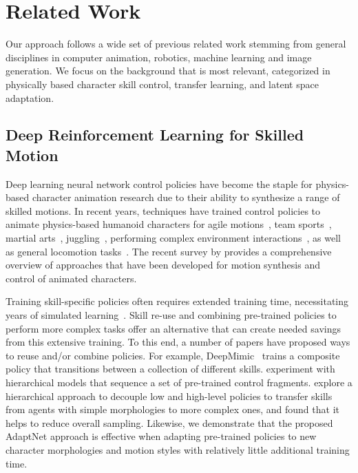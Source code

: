 \section{Related Work}
Our approach follows a wide set of previous related work stemming from general disciplines in computer animation, robotics, machine learning and image generation.  We focus on the background
that is most relevant, categorized in physically based character skill control, transfer learning, and latent space adaptation. 


\subsection{Deep Reinforcement Learning for Skilled Motion}

Deep learning neural network control policies have become the staple 
for physics-based character animation research due to their ability to synthesize a range of skilled motions. In recent years, techniques have trained control policies to animate physics-based humanoid characters for agile motions~\cite{Yin2021}, team sports~\cite{Xie2022, Liu2018}, martial arts~\cite{won2021control}, juggling~\cite{Chemin2018,Luo2021,composite}, performing complex environment interactions~\cite{Merel2020}, as well as general locomotion tasks~\cite{Bergamin2019,Peng2018}. The recent survey by \citet{DeepSurvey2021} provides a comprehensive overview of approaches that have been developed for motion synthesis and control of animated characters. 

Training skill-specific policies often requires extended training time, necessitating years of simulated learning~\cite{peng2022ase}. Skill re-use and combining pre-trained policies to perform more complex tasks offer an alternative that can create needed savings from this extensive training. To this end, a number of papers have proposed ways to reuse and/or combine policies.  For example, DeepMimic~\cite{Peng2018} trains a composite policy that transitions between a collection of different skills. \citet{Liu2017} experiment with hierarchical models that sequence a set of pre-trained control fragments. \citet{hejna20a} explore a hierarchical approach to decouple low and high-level policies to transfer skills from agents with simple morphologies to more complex ones, and found that it helps to reduce overall sampling.  
Likewise, we demonstrate that the proposed AdaptNet approach is effective when adapting pre-trained policies to new character morphologies and motion styles with relatively little additional training time. 

